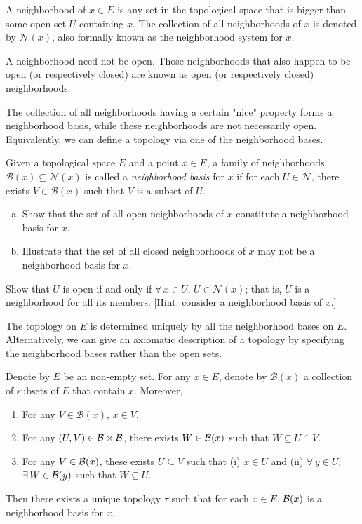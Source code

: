 A neighborhood of $x \in E$ is any set in the topological space that is bigger than some open set $U$ containing $x$.
The collection of all neighborhoods of $x$ is denoted by $\mathcal N(x)$, also formally known as the neighborhood system for $x$.

A neighborhood need not be open.
Those neighborhoods that also happen to be open (or respectively closed) are known as open (or respectively closed) neighborhoods.

The collection of all neighborhoods having a certain "nice" property forms a neighborhood basis,
while these neighborhoods are not necessarily open.
Equivalently, we can define a topology via one of the neighborhood bases.

\begin{qst}
  Given a topological space $E$ and a point $x \in E$, a family of neighborhoods $\mathcal B(x) \subseteq \mathcal N(x)$ is called a {\em neighborhood basis} for $x$ if for each $U \in \mathcal N$, there exists $V \in \mathcal B(x)$ such that $V$ is a subset of $U$.
  \begin{enumerate}[(a)]
    \item Show that the set of all open neighborhoods of $x$ constitute a  neighborhood basis for $x$.
    \item Illustrate that the set of all closed neighborhoods of $x$ may not be a neighborhood basis for $x$.    
  \end{enumerate}
\end{qst}

\begin{qst}
  Show that $U$ is open if and only if $\forall\, x \in U$, $U \in \mathcal N(x)$; that is, $U$ is a neighborhood for all its members. [Hint: consider a neighborhood basis of $x$.]
\end{qst}

The topology on $E$ is determined uniquely by all the neighborhood bases on $E$. Alternatively, we can give an axiomatic description of a topology by specifying the neighborhood bases rather than the open sets.    
\medskip

 Denote by $E$ be an non-empty set.
For any $x \in E$, denote by $\mathcal B(x)$ a collection of subsets of $E$ that contain $x$. Moreover,
\begin{enumerate}[(B1)]
  \item For any $V \in \mathcal B(x)$, $x \in V$.
  \item For any $(U,V) \in \mathcal{B} \times \mathcal{B}$, there exists $W \in \mathcal{B} (x)$ such that $W \subseteq U \cap V$.
  \item For any $V \in \mathcal{B} (x)$, these exists $U \subseteq V$ such that (i) $x \in U$ and (ii)  $\forall \, y \in U$, $\exists\, W \in \mathcal{B}(y)$ such that $W \subseteq U$. 
\end{enumerate}  
Then there exists a unique topology $\tau$ such that for each $x \in E$, $\mathcal{B}(x)$ is a neighborhood basis for $x$.

